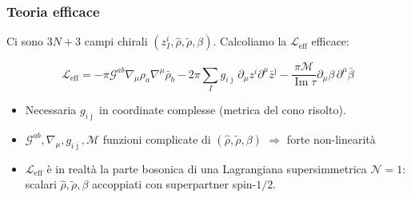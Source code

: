 \documentclass[aspectratio=43,mathserif]{beamer}
\newcommand{\ess}{\mathbb{S}}
\newcommand{\ssn}{\mathcal{N}}
\newcommand{\hatt}[1]{\ensuremath{\widehat{#1}}}
\newcommand{\tildd}[1]{\ensuremath{\widetilde{#1}}}
\renewcommand{\Im}{\ensuremath{\operatorname{Im}}}
\newcommand{\leff}{\ensuremath{\mathcal{L}_\text{eff}}}
\begin{document}
%
%


\begin{frame}
	\frametitle{Teoria efficace}
	Ci sono $3N+3$ campi chirali $(z_I^i, \hatt\rho, \tildd\rho, \beta)$. Calcoliamo la $\leff$ efficace:

	\begin{equation}
		\leff = - \pi \mathcal{G}^{ab} \nabla_\mu \rho_a \nabla^\mu \bar\rho_b - 2\pi \sum_I g_{i\bar\jmath}\, \partial_\mu z^i \partial^\mu \bar z^{\bar\jmath} - \frac{\pi\mathcal{M}}{\Im \tau} \partial_\mu \beta \,\partial^\mu \bar\beta
		\label{}
	\end{equation}

	\begin{itemize}
		\item Necessaria $g_{i\bar\jmath}$ in coordinate complesse (metrica del cono risolto).
		\item $\mathcal{G}^{ab},\nabla_\mu,g_{i\bar\jmath},\mathcal{M}$ funzioni complicate di $(\hatt\rho,\tildd\rho,\beta)$ $\Longrightarrow$ forte non-linearità
		\item $\leff$ è in realtà la parte bosonica di una Lagrangiana supersimmetrica $\ssn=1$: scalari $\hatt\rho,\tildd\rho,\beta$ accoppiati con superpartner spin-$1/2$.
	\end{itemize}



\end{frame}
\end{document}
